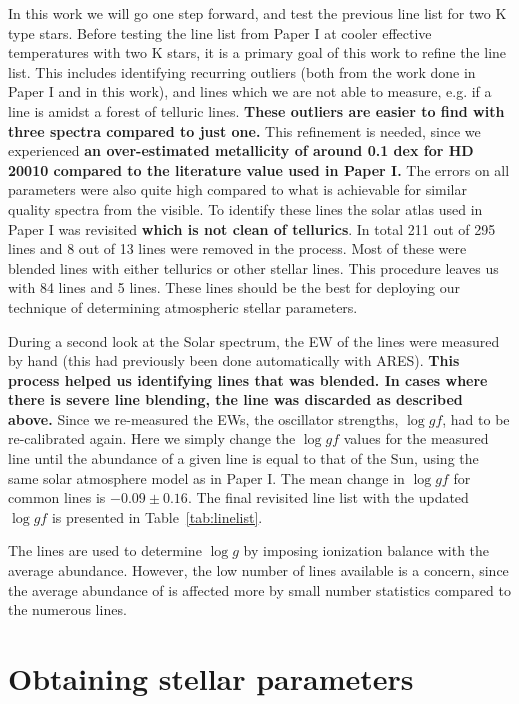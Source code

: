 \documentclass{aa}
\begin{document}
In this work we will go one step forward, and test the previous line list for two K type stars.
Before testing the line list from Paper I at cooler effective temperatures with two K stars, it is a
primary goal of this work to refine the line list. This includes identifying recurring outliers
(both from the work done in Paper I and in this work), and lines which we are not able to measure,
e.g. if a line is amidst a forest of telluric lines. {\bf These outliers are easier to find with
three spectra compared to just one.} This refinement is needed, since we experienced {\bf an
over-estimated metallicity of around 0.1 dex for HD 20010 compared to the literature value used in
Paper I.} The errors on all parameters were also quite high compared to what is achievable for
similar quality spectra from the visible. To identify these lines the solar atlas used in Paper I
was revisited {\bf which is not clean of tellurics}. In total 211 out of 295  lines and 8
out of 13  lines were removed in the process. Most of these were blended lines with
either tellurics or other stellar lines. This procedure leaves us with 84  lines and 5
 lines. These lines should be the best for deploying our technique of determining
atmospheric stellar parameters.

During a second look at the Solar spectrum, the EW of the lines were measured by hand (this had
previously been done automatically with ARES). {\bf This process helped us identifying lines that
was blended. In cases where there is severe line blending, the line was discarded as described
above.} Since we re-measured the EWs, the oscillator strengths, $\log \mathit{gf}$, had to be
re-calibrated again. Here we simply change the $\log \mathit{gf}$ values for the measured line until
the abundance of a given line is equal to that of the Sun, using the same solar atmosphere model as
in Paper I. The mean change in $\log \mathit{gf}$ for common lines is $-0.09 \pm 0.16$. The final
revisited line list with the updated $\log \mathit{gf}$ is presented in Table~\ref{tab:linelist}.

The  lines are used to determine $\log g$ by imposing ionization
balance with the average  abundance. However, the low number of
 lines available is a concern, since the average abundance of
 is affected more by small number statistics compared to the
numerous  lines.


\section{Obtaining stellar parameters}
\label{sec:method}
\end{document}
